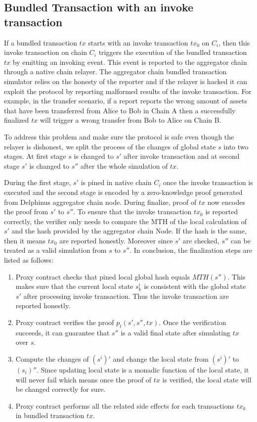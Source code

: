 \documentclass[pageno]{jpaper}
\begin{document}
\subsection{Bundled Transaction with an invoke transaction}
If a bundled transaction $tx$ starts with an invoke transaction $tx_0$ on $C_i$, then this invoke transaction on chain $C_i$ triggers the execution of the bundled transaction $tx$ by emitting an invoking event. This event is reported to the aggregator chain through a native chain relayer. The aggregator chain bundled transaction simulator relies on the honesty of the reporter and if the relayer is hacked it can exploit the protocol by reporting malformed results of the invoke transaction. For example, in the transfer scenario, if a report reports the wrong amount of assets that have been transferred from Alice to Bob in Chain A then a successfully finalized $tx$ will trigger a wrong transfer from Bob to Alice on Chain B.

To address this problem and make sure the protocol is safe even though the relayer is dishonest, we split the process of the changes of global state $s$ into two stages. At first stage $s$ is changed to $s'$ after invoke transaction and at second stage $s'$ is changed to $s''$ after the whole simulation of $tx$.

During the first stage, $s'$ is pined in native chain $C_i$ once the invoke transaction is executed and the second stage is encoded by a zero-knowledge proof generated from Delphinus aggregator chain node. During finalize, proof of $tx$ now encodes the proof from $s'$ to $s''$. To ensure that the invoke transaction $tx_0$ is reported correctly, the verifier only needs to compare the MTH of the local calculation of $s'$ and the hash provided by the aggregator chain Node. If the hash is the same, then it means $tx_0$ are reported honestly. Moreover since $s'$ are checked, $s''$ can be treated as a valid simulation from $s$ to $s''$. In conclusion, the finalization steps are listed as follows:

\begin{enumerate}[leftmargin=*]
\item Proxy contract checks that pined local global hash equals $MTH(s'')$. This makes sure that the current local state $s_k^i$ is consistent with the global state $s'$ after processing invoke transaction. Thus the invoke transaction are reported honestly.

\item Proxy contract verifies the proof $p_{t}(s', s'', tx)$. Once the verification succeeds, it can guarantee that $s''$ is a valid final state after simulating $tx$ over $s$.

\item Compute the changes of $(s^i)'$ and change the local state from $(s^i)'$ to $(s_i)''$. Since updating local state is a monadic function of the local state, it will never fail which means once the proof of $tx$ is verified, the local state will be changed correctly for sure.

\item Proxy contract performs all the related side effects for each transactions $tx_k$ in bundled transaction $tx$. 
\end{enumerate}
\end{document}

